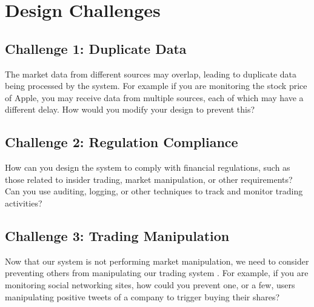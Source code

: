 \documentclass{csse4400}
\begin{document}
\section{Design Challenges}

\subsection*{Challenge 1: Duplicate Data}
The market data from different sources may overlap,
leading to duplicate data being processed by the system.
For example if you are monitoring the stock price of Apple,
you may receive data from multiple sources,
each of which may have a different delay.
How would you modify your design to prevent this?

\subsection*{Challenge 2: Regulation Compliance}
How can you design the system to comply with financial regulations,
such as those related to insider trading, market manipulation, or other requirements?
Can you use auditing, logging, or other techniques to track and monitor trading activities?

\subsection*{Challenge 3: Trading Manipulation}
Now that our system is not performing market manipulation,
we need to consider preventing others from manipulating our trading system \cite{bot-manipulation}.
For example,
if you are monitoring social networking sites,
how could you prevent one, or a few, users manipulating positive tweets of a company to trigger buying their shares?



\end{document}
